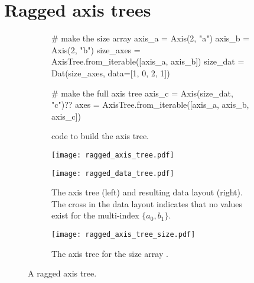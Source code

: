 \documentclass[thesis]{subfiles}
\begin{document}
\section{Ragged axis trees}
\label{sec:ragged_axis_trees}

\begin{figure}
  \centering
  \begin{subfigure}{.9\textwidth}
    \begin{pyalg2}
      # make the size array
      axis_a = Axis(2, "a")
      axis_b = Axis(2, "b")
      size_axes = AxisTree.from_iterable([axis_a, axis_b])
      size_dat = Dat(size_axes, data=[1, 0, 2, 1])

      # make the full axis tree
      axis_c = Axis(size_dat, "c")?\label{code:ragged_size_dat}?
      axes = AxisTree.from_iterable([axis_a, axis_b, axis_c])
    \end{pyalg2}
    \caption{ code to build the axis tree.}
  \end{subfigure}

  \vspace{1em}

  \begin{subfigure}{\textwidth}
    \centering
    \begin{minipage}{.4\textwidth}
      \begin{center}
        \texttt{[image: ragged\_axis\_tree.pdf]}
      \end{center}
    \end{minipage}
    \begin{minipage}{.58\textwidth}
      \begin{center}
        \texttt{[image: ragged\_data\_tree.pdf]}
      \end{center}
    \end{minipage}
    \caption{
      The axis tree (left) and resulting data layout (right).
      The cross in the data layout indicates that no values exist for the multi-index $\{a_0, b_1\}$.
    }
  \end{subfigure}

  \vspace{1em}

  \begin{subfigure}{\textwidth}
    \centering
    \texttt{[image: ragged\_axis\_tree\_size.pdf]}
    \caption{
      The axis tree for the size array \pycode{[[1,0],[2,1]][?$i_a$?,?$i_b$?]}.
    }

  \end{subfigure}

  \caption{
    A ragged axis tree.
  }
  \label{fig:ragged_axis_tree}
\end{figure}
\end{document}
